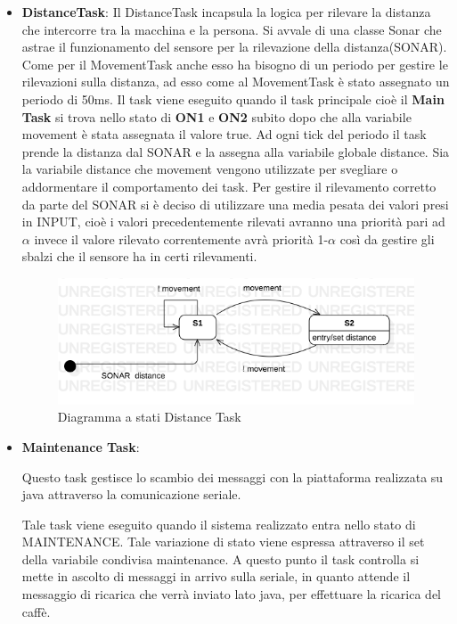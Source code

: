 \documentclass[a4paper]{article}
\begin{document}
\begin{itemize}
\item \textbf{DistanceTask}:
Il DistanceTask incapsula la logica per rilevare la distanza che intercorre tra la macchina e la persona. Si avvale di una classe Sonar che astrae il funzionamento del sensore per la rilevazione della distanza(SONAR). Come per il MovementTask anche esso ha bisogno di un periodo per gestire le rilevazioni sulla distanza, ad esso come al MovementTask è stato assegnato un periodo di 50ms. 
Il task viene eseguito quando il task principale cioè il \textbf{Main Task} si trova nello stato di \textbf{ON1} e \textbf{ON2} subito dopo che alla variabile movement è stata assegnata il valore true.
Ad ogni tick del periodo il task prende la distanza dal SONAR e la assegna alla variabile globale distance. Sia la variabile distance che movement vengono utilizzate per svegliare o addormentare il comportamento dei task. Per gestire il rilevamento corretto da parte del SONAR si è deciso di utilizzare una media pesata dei valori presi in INPUT, cioè i valori precedentemente rilevati avranno una priorità pari ad $\alpha$ invece il valore rilevato correntemente avrà priorità 1-$\alpha$ così da gestire gli sbalzi che il sensore ha in certi rilevamenti.   

\begin{figure}[h!]
	\includegraphics[scale = 0.60]{DistanceTask.png}
	\caption{Diagramma a stati Distance Task}
\end{figure}

\newpage


\item \textbf{Maintenance Task}:

Questo task gestisce lo scambio dei messaggi con la piattaforma realizzata su java attraverso la comunicazione seriale.

Tale task viene eseguito quando il sistema realizzato entra nello stato di MAINTENANCE. Tale variazione di stato viene espressa attraverso il set della variabile condivisa maintenance.
A questo punto il task controlla si mette in ascolto di messaggi in arrivo sulla seriale, in quanto attende il messaggio di ricarica che verrà inviato lato java, per effettuare la ricarica del caffè.


\end{itemize}
\end{document}
